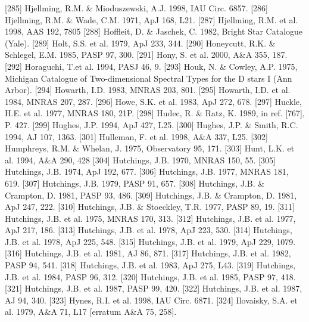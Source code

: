 \documentclass{aa}
\begin{document}
\begin{thebibliography}{}
\bibitem[]{}[285] Hjellming, R.M. \& Mioduszewski, A.J. 1998, IAU Circ. 6857.
\bibitem[]{}[286] Hjellming, R.M. \& Wade, C.M. 1971, ApJ 168, L21.
\bibitem[]{}[287] Hjellming, R.M. et al. 1998, AAS 192, 7805
\bibitem[]{}[288] Hoffleit, D. \& Jaschek, C. 1982, Bright Star Catalogue (Yale).
\bibitem[]{}[289] Holt, S.S. et al. 1979, ApJ 233, 344.
\bibitem[]{}[290] Honeycutt, R.K. \& Schlegel, E.M. 1985, PASP 97, 300.
\bibitem[]{}[291] Hony, S. et al. 2000, A\&A 355, 187.
\bibitem[]{}[292] Horaguchi, T.et al. 1994, PASJ 46, 9.
\bibitem[]{}[293] Houk, N. \& Cowley, A.P. 1975, Michigan Catalogue of Two-dimensional Spectral 
                                 Types for the D stars I (Ann Arbor).
\bibitem[]{}[294] Howarth, I.D. 1983, MNRAS 203, 801.
\bibitem[]{}[295] Howarth, I.D. et al. 1984, MNRAS 207, 287.
\bibitem[]{}[296] Howe, S.K. et al. 1983, ApJ 272, 678.
\bibitem[]{}[297] Huckle, H.E. et al. 1977, MNRAS 180, 21P.
\bibitem[]{}[298] Hudec, R. \& Ratz, K. 1989, in ref. [767], P. 427.
\bibitem[]{}[299] Hughes, J.P. 1994, ApJ 427, L25.                            
\bibitem[]{}[300] Hughes, J.P. \& Smith, R.C. 1994, AJ 107, 1363.  
\bibitem[]{}[301] Hulleman, F. et al. 1998, A\&A 337, L25.
\bibitem[]{}[302] Humphreys, R.M. \& Whelan, J. 1975, Observatory 95, 171.
\bibitem[]{}[303] Hunt, L.K. et al. 1994, A\&A 290, 428
\bibitem[]{}[304] Hutchings, J.B. 1970, MNRAS 150, 55.
\bibitem[]{}[305] Hutchings, J.B. 1974, ApJ 192, 677.
\bibitem[]{}[306] Hutchings, J.B. 1977, MNRAS 181, 619.
\bibitem[]{}[307] Hutchings, J.B. 1979, PASP 91, 657.
\bibitem[]{}[308] Hutchings, J.B. \& Crampton, D. 1981, PASP 93, 486.
\bibitem[]{}[309] Hutchings, J.B. \& Crampton, D. 1981, ApJ 247, 222.
\bibitem[]{}[310] Hutchings, J.B. \& Stoeckley, T.R. 1977, PASP 89, 19.
\bibitem[]{}[311] Hutchings, J.B. et al. 1975, MNRAS 170, 313.
\bibitem[]{}[312] Hutchings, J.B. et al. 1977, ApJ 217, 186.
\bibitem[]{}[313] Hutchings, J.B. et al. 1978, ApJ 223, 530.
\bibitem[]{}[314] Hutchings, J.B. et al. 1978, ApJ 225, 548.
\bibitem[]{}[315] Hutchings, J.B. et al. 1979, ApJ 229, 1079.
\bibitem[]{}[316] Hutchings, J.B. et al. 1981, AJ 86, 871.
\bibitem[]{}[317] Hutchings, J.B. et al. 1982, PASP 94, 541.
\bibitem[]{}[318] Hutchings, J.B. et al. 1983, ApJ 275, L43.
\bibitem[]{}[319] Hutchings, J.B. et al. 1984, PASP 96, 312.
\bibitem[]{}[320] Hutchings, J.B. et al. 1985, PASP 97, 418.
\bibitem[]{}[321] Hutchings, J.B. et al. 1987, PASP 99, 420.
\bibitem[]{}[322] Hutchings, J.B. et al. 1987, AJ 94, 340.
\bibitem[]{}[323] Hynes, R.I. et al. 1998, IAU Circ. 6871.   
\bibitem[]{}[324] Ilovaisky, S.A. et al. 1979, A\&A 71, L17 [erratum A\&A 75, 258].

\end{thebibliography}
\end{document}
